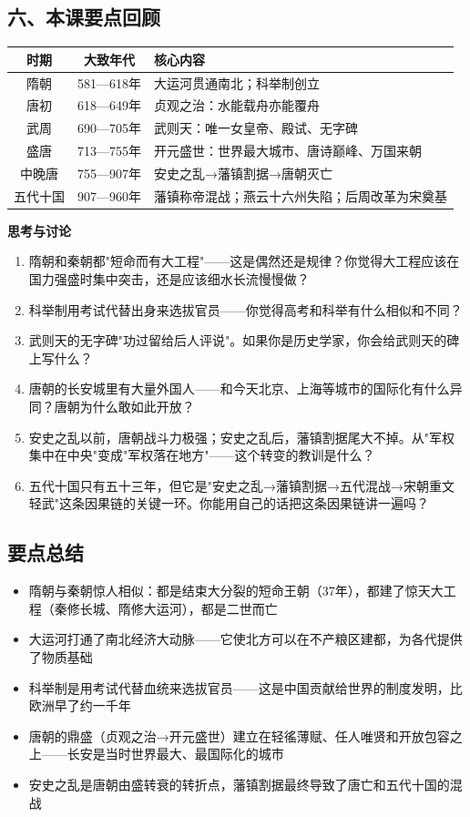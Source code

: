 \documentclass[a4paper,12pt]{ctexart}
\begin{document}
\subsection*{六、本课要点回顾}

\begin{center}
\begin{tabular}{|c|c|p{8cm}|}
\hline
\textbf{时期} & \textbf{大致年代} & \textbf{核心内容} \\
\hline
隋朝 & 581—618年 & 大运河贯通南北；科举制创立 \\
\hline
唐初 & 618—649年 & 贞观之治：水能载舟亦能覆舟 \\
\hline
武周 & 690—705年 & 武则天：唯一女皇帝、殿试、无字碑 \\
\hline
盛唐 & 713—755年 & 开元盛世：世界最大城市、唐诗巅峰、万国来朝 \\
\hline
中晚唐 & 755—907年 & 安史之乱→藩镇割据→唐朝灭亡 \\
\hline
五代十国 & 907—960年 & 藩镇称帝混战；燕云十六州失陷；后周改革为宋奠基 \\
\hline
\end{tabular}
\end{center}

{\large\textcolor{orange!80!black}{\textbf{思考与讨论}}}
\begin{enumerate}
  \item 隋朝和秦朝都"短命而有大工程"——这是偶然还是规律？你觉得大工程应该在国力强盛时集中突击，还是应该细水长流慢慢做？
  \item 科举制用考试代替出身来选拔官员——你觉得高考和科举有什么相似和不同？
  \item 武则天的无字碑"功过留给后人评说"。如果你是历史学家，你会给武则天的碑上写什么？
  \item 唐朝的长安城里有大量外国人——和今天北京、上海等城市的国际化有什么异同？唐朝为什么敢如此开放？
  \item 安史之乱以前，唐朝战斗力极强；安史之乱后，藩镇割据尾大不掉。从"军权集中在中央"变成"军权落在地方"——这个转变的教训是什么？
  \item 五代十国只有五十三年，但它是"安史之乱→藩镇割据→五代混战→宋朝重文轻武"这条因果链的关键一环。你能用自己的话把这条因果链讲一遍吗？
\end{enumerate}

\subsection*{要点总结}
\begin{itemize}
  \item 隋朝与秦朝惊人相似：都是结束大分裂的短命王朝（37年），都建了惊天大工程（秦修长城、隋修大运河），都是二世而亡
  \item 大运河打通了南北经济大动脉——它使北方可以在不产粮区建都，为各代提供了物质基础
  \item 科举制是用考试代替血统来选拔官员——这是中国贡献给世界的制度发明，比欧洲早了约一千年
  \item 唐朝的鼎盛（贞观之治→开元盛世）建立在轻徭薄赋、任人唯贤和开放包容之上——长安是当时世界最大、最国际化的城市
  \item 安史之乱是唐朝由盛转衰的转折点，藩镇割据最终导致了唐亡和五代十国的混战
\end{itemize}
\end{document}

